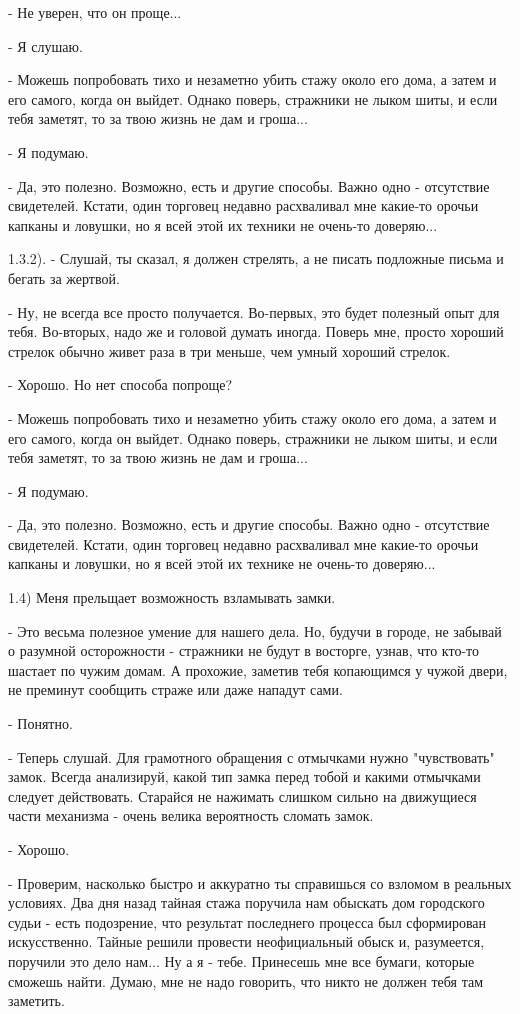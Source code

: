 \documentclass[12pt,a4paper]{book}
\begin{document}
- Не уверен, что он проще...

- Я слушаю.

- Можешь попробовать тихо и незаметно убить стажу около его дома, а затем и его самого, когда он выйдет. Однако поверь, стражники не лыком шиты, и если тебя заметят, то за твою жизнь не дам и гроша...

- Я подумаю.

- Да, это полезно. Возможно, есть и другие способы. Важно одно - отсутствие свидетелей. Кстати, один торговец недавно расхваливал мне какие-то орочьи капканы и ловушки, но я всей этой их техники не очень-то доверяю...  

1.3.2). - Слушай, ты сказал, я должен стрелять, а не писать подложные письма и бегать за жертвой.

- Ну, не всегда все просто получается. Во-первых, это будет полезный опыт для тебя. Во-вторых, надо же и головой думать иногда. Поверь мне, просто хороший стрелок обычно живет раза в три меньше, чем умный хороший стрелок.

- Хорошо. Но нет способа попроще?

- Можешь попробовать тихо и незаметно убить стажу около его дома, а затем и его самого, когда он выйдет. Однако поверь, стражники не лыком шиты, и если тебя заметят, то за твою жизнь не дам и гроша...

- Я подумаю.

- Да, это полезно. Возможно, есть и другие способы. Важно одно - отсутствие свидетелей. Кстати, один торговец недавно расхваливал мне какие-то орочьи капканы и ловушки, но я всей этой их технике не очень-то доверяю...

1.4) Меня прельщает возможность взламывать замки.

- Это весьма полезное умение для нашего дела. Но, будучи в городе, не забывай о разумной осторожности - стражники не будут в восторге, узнав, что кто-то шастает по чужим домам. А прохожие, заметив тебя копающимся у чужой двери, не преминут сообщить страже или даже нападут сами.

- Понятно.

- Теперь слушай. Для грамотного обращения с отмычками нужно "чувствовать" замок. Всегда анализируй, какой тип замка перед тобой и какими отмычками следует действовать. Старайся не нажимать слишком сильно на движущиеся части механизма - очень велика вероятность сломать замок.

- Хорошо.

- Проверим, насколько быстро и аккуратно ты справишься со взломом в реальных условиях. Два дня назад тайная стажа поручила нам обыскать дом городского судьи - есть подозрение, что результат последнего процесса был сформирован искусственно. Тайные решили провести неофициальный обыск и, разумеется, поручили это дело нам... Ну а я - тебе. Принесешь мне все бумаги, которые сможешь найти. Думаю, мне не надо говорить, что никто не должен тебя там заметить.
\end{document}
